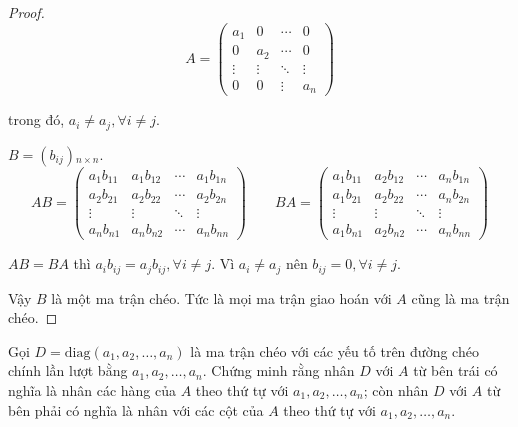 \documentclass[class=nhvh-linear-algebra,crop=false]{standalone}
\begin{document}
\begin{proof}
    \[
        A =
        \begin{pmatrix}
            a_{1}  & 0      & \cdots & 0      \\
            0      & a_{2}  & \cdots & 0      \\
            \vdots & \vdots & \ddots & \vdots \\
            0      & 0      & \vdots & a_{n}
        \end{pmatrix}
    \]
    \par trong đó, $a_{i}\ne a_{j},\forall i\ne j$.
    \par $B = (b_{ij}){}_{n\times n}$.
    \[
        AB =
        \begin{pmatrix}
            a_{1}b_{11} & a_{1}b_{12} & \cdots & a_{1}b_{1n} \\
            a_{2}b_{21} & a_{2}b_{22} & \cdots & a_{2}b_{2n} \\
            \vdots      & \vdots      & \ddots & \vdots      \\
            a_{n}b_{n1} & a_{n}b_{n2} & \cdots & a_{n}b_{nn}
        \end{pmatrix}
        \qquad
        BA =
        \begin{pmatrix}
            a_{1}b_{11} & a_{2}b_{12} & \cdots & a_{n}b_{1n} \\
            a_{1}b_{21} & a_{2}b_{22} & \cdots & a_{n}b_{2n} \\
            \vdots      & \vdots      & \ddots & \vdots      \\
            a_{1}b_{n1} & a_{2}b_{n2} & \cdots & a_{n}b_{nn}
        \end{pmatrix}
    \]
    \par $AB = BA$ thì $a_{i}b_{ij} = a_{j}b_{ij},\forall i\ne j$. Vì $a_{i} \ne a_{j}$ nên $b_{ij} = 0,\forall i\ne j$.
    \par Vậy $B$ là một ma trận chéo. Tức là mọi ma trận giao hoán với $A$ cũng là ma trận chéo.
\end{proof}

\begin{exercise}
    Gọi $D = \text{diag}(a_{1},a_{2},\ldots,a_{n})$ là ma trận chéo với các yếu tố trên đường chéo chính lần lượt bằng $a_{1}, a_{2}, \ldots, a_{n}$. Chứng minh rằng nhân $D$ với $A$ từ bên trái có nghĩa là nhân các hàng của $A$ theo thứ tự với $a_{1}, a_{2},\ldots,a_{n}$; còn nhân $D$ với $A$ từ bên phải có nghĩa là nhân với các cột của $A$ theo thứ tự với $a_{1}, a_{2}, \ldots, a_{n}$.
\end{exercise}
\end{document}
